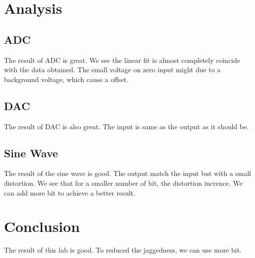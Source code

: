 \documentclass[aps,prl,reprint]{revtex4-1}
\begin{document}
\section{Analysis}
    \subsection{ADC}
        The result of ADC is great. We see the linear fit is almost completely coincide with the data obtained. The small voltage on zero input might due to a background voltage, which cause a offset.
    \subsection{DAC}
        The result of DAC is also great. The input is same as the output as it should be.
    \subsection{Sine Wave}
        The result of the sine wave is good. The output match the input but with a small distortion. We see that for a smaller number of bit, the distortion incrence. We can add more bit to achieve a better result.
\section{Conclusion}
    The result of this lab is good. To reduced the jaggedness, we can use more bit.







\end{document}
